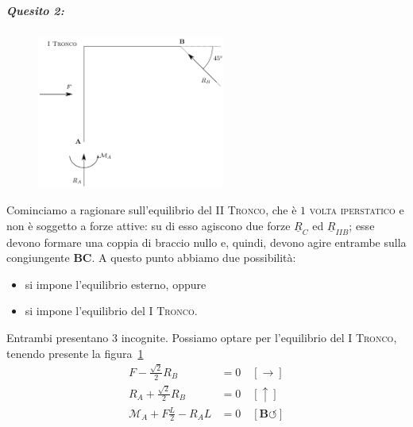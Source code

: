 \noindent \subparagraph{Quesito 2:}
\renewcommand{\thefigure}{8.2~-~2}
\begin{figure}[ht]
\centering
\includegraphics[width=0.55\textwidth]{Immagini/Parte_8/Esercizio8_2/Esercizio8_2_2.pdf}
\caption{}
\label{Esercizio8-2-2}
\end{figure}
Cominciamo a ragionare sull'equilibrio del \textsc{II Tronco}, che è $1$ \textsc{volta iperstatico} e non è soggetto a forze attive: su di esso agiscono due forze $\underline{R}_C$ ed $\underline{R}_{IIB}$; esse devono formare una coppia di braccio nullo e, quindi, devono agire entrambe sulla congiungente $\mathbf{B}\mathbf{C}$. A questo punto abbiamo due possibilità: 
\begin{itemize}
\item si impone l'equilibrio esterno, oppure
\item si impone l'equilibrio del \textsc{I Tronco}.
\end{itemize}
Entrambi presentano $3$ incognite. Possiamo optare per l'equilibrio del \textsc{I Tronco}, tenendo presente la figura~\ref{Esercizio8-2-2}
\begin{align*}
F - \frac{\sqrt{2}}{2}R_B                        &= 0 \quad [\rightarrow] \\
R_A + \frac{\sqrt{2}}{2}R_B                   &= 0 \quad [\uparrow]    \\
\mathcal{M}_{A} + F\frac{L}{2} - R_{A}L &= 0 \quad [\mathbf{B} \circlearrowleft]
\end{align*}
